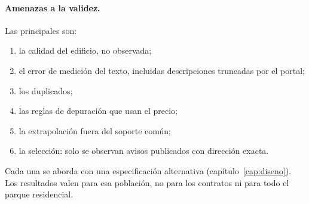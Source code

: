 \paragraph{Amenazas a la validez.} Las principales son:
\begin{enumerate}[label=(\roman*)]
\item la calidad del edificio, no observada;
\item el error de medición del texto, incluidas descripciones truncadas por el portal;
\item los duplicados;
\item las reglas de depuración que usan el precio;
\item la extrapolación fuera del soporte común;
\item la selección: solo se observan avisos publicados con dirección exacta.
\end{enumerate}
Cada una se aborda con una especificación alternativa (capítulo~\ref{cap:diseno}). Los resultados valen para esa población, no para los contratos ni para todo el parque residencial.
